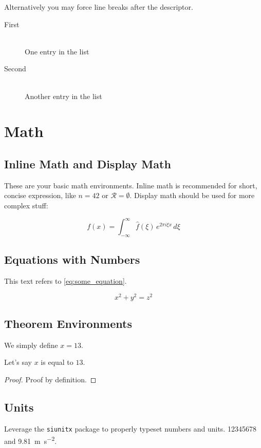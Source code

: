 Alternatively you may force line breaks after the descriptor.

\begin{description}
	\item[First]\hfill\\
	      One entry in the list
	\item[Second]\hfill\\
	      Another entry in the list
\end{description}

\section{Math}

\subsection{Inline Math and Display Math}

These are your basic math environments.
Inline math is recommended for short, concise expression, like $n = 42$ or $\mathcal{R} = \emptyset$.
Display math should be used for more complex stuff:

$$f(x) = \int_{-\infty}^\infty \hat f(\xi)\,e^{2 \pi i \xi x} \,d\xi$$

\subsection{Equations with Numbers}

This text refers to \cref{eq:some_equation}.

\begin{equation}\label{eq:some_equation}
	x^2 + y^2 = z^2
\end{equation}

\subsection{Theorem Environments}

\begin{definition}
	We simply define $x = 13$.
\end{definition}

\begin{theorem}
	Let's say $x$ is equal to $13$.
\end{theorem}

\begin{proof}
	Proof by definition.
\end{proof}

\subsection{Units}

Leverage the \texttt{siunitx} package to properly typeset numbers and units.
\num{12345678} and \SI{9.81}{\meter\per\second^2}.
